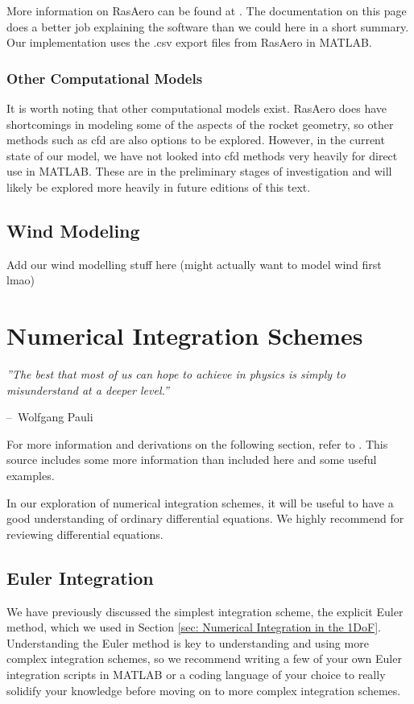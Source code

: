 \documentclass[12pt]{report}
\makeatletter
\newenvironment{chapquote}[2][2em]
  {\setlength{\@tempdima}{#1}%
   \def\chapquote@author{#2}%
   \parshape 1 \@tempdima \dimexpr\textwidth-2\@tempdima\relax%
   \itshape}
  {\par\normalfont\hfill--\ \chapquote@author\hspace*{\@tempdima}\par\bigskip}
\makeatother
\begin{document}
{More information on RasAero can be found at \cite{rogers_rasaero_2019}. The documentation on this page does a better job explaining the software than we could here in a short summary. Our implementation uses the .csv export files from RasAero in MATLAB.
\subsection{Other Computational Models}
It is worth noting that other computational models exist. RasAero does have shortcomings in modeling some of the aspects of the rocket geometry, so other methods such as \gls{cfd} are also options to be explored. However, in the current state of our model, we have not looked into \gls{cfd} methods very heavily for direct use in MATLAB. These are in the preliminary stages of investigation and will likely be explored more heavily in future editions of this text.
\section{Wind Modeling}
Add our wind modelling stuff here (might actually want to model wind first lmao)

\chapter{Numerical Integration Schemes}\label{sec:numerical integration schemes}

\begin{chapquote}{Wolfgang Pauli}
    ''The best that most of us can hope to achieve in physics is simply to misunderstand at a deeper level.''
\end{chapquote}
For more information and derivations on the following section, refer to \cite{trench_31_2020}. This source includes some more information than included here and some useful examples.

In our exploration of numerical integration schemes, it will be useful to have a good understanding of ordinary differential equations. We highly recommend \cite{dawkins_differential_2023} for reviewing differential equations.

\section{Euler Integration}\label{sec:euler integration}
We have previously discussed the simplest integration scheme, the explicit Euler method, which we used in Section \ref{sec: Numerical Integration in the 1DoF}. Understanding the Euler method is key to understanding and using more complex integration schemes, so we recommend writing a few of your own Euler integration scripts in MATLAB or a coding language of your choice to really solidify your knowledge before moving on to more complex integration schemes. 

}
\end{document}
